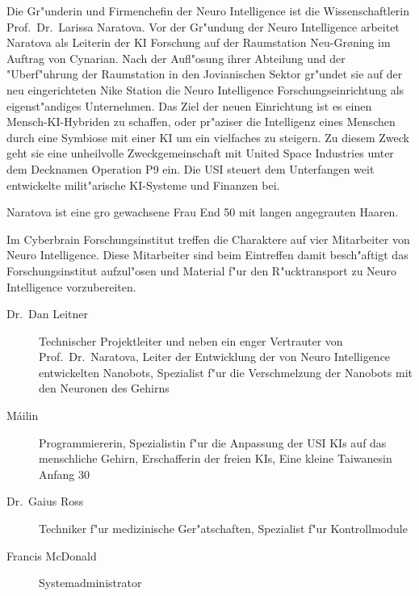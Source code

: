 \renewcommand{\ml}{\pinyin{Mailin2}}


Die Gr"underin und Firmenchefin der Neuro Intelligence ist die Wissenschaftlerin Prof.~Dr.~Larissa Naratova. Vor der Gr"undung der Neuro Intelligence arbeitet Naratova als Leiterin der KI Forschung auf der Raumstation Neu-Gr{\o}ning im Auftrag von Cynarian. Nach der Aufl"osung ihrer Abteilung und der "Uberf"uhrung der Raumstation in den Jovianischen Sektor gr"undet sie auf der neu eingerichteten Nike Station die Neuro Intelligence Forschungseinrichtung als eigenst"andiges Unternehmen. Das Ziel der neuen Einrichtung ist es einen Mensch-KI-Hybriden zu schaffen, oder pr"aziser die Intelligenz eines Menschen durch eine Symbiose mit einer KI um ein vielfaches zu steigern. Zu diesem Zweck  geht sie eine unheilvolle Zweckgemeinschaft mit United Space Industries unter dem Decknamen Operation P9 ein. Die USI steuert dem Unterfangen weit entwickelte milit"arische KI-Systeme und Finanzen bei.

Naratova ist eine gro\3 gewachsene Frau End 50 mit langen angegrauten Haaren. 


Im Cyberbrain Forschungsinstitut treffen die Charaktere auf vier Mitarbeiter von Neuro Intelligence. Diese Mitarbeiter sind beim Eintreffen damit besch"aftigt das Forschungsinstitut aufzul"osen und Material f"ur den R"ucktransport zu Neuro Intelligence vorzubereiten.

\begin{description}
    \item[Dr.~Dan Leitner] Technischer Projektleiter und neben \ml{} ein enger Vertrauter von Prof.~Dr.~Naratova, Leiter der Entwicklung 
        der von Neuro Intelligence entwickelten Nanobots, Spezialist f"ur die Verschmelzung  der  Nanobots mit den Neuronen des Gehirns
    \item[M\'{a}ilin] Programmiererin, Spezialistin f"ur die Anpassung der USI KIs auf das menschliche Gehirn, Erschafferin der freien KIs, 
        Eine kleine Taiwanesin Anfang 30
    \item[Dr.~Gaius Ross] Techniker f"ur medizinische Ger"atschaften, Spezialist f"ur Kontrollmodule
    \item[Francis McDonald] Systemadministrator
\end{description}
\vfill\newpage

